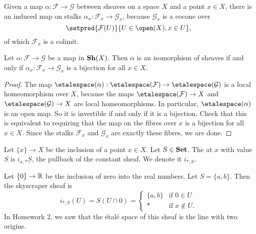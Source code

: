 Given a map $\alpha\colon \mathcal{F} \to \mathcal{G}$ between sheaves on a space $X$ and a point $x \in X$, there is an induced map on stalks $\alpha_x\colon \mathcal{F}_x \to \mathcal{G}_x$, because $\mathcal{G}_x$ is a cocone over
\[\setpred{\mathcal{F}(U)}{U \in \open(X),x \in U}\text{,}\]
of which $\mathcal{F}_x$ is a colimit. 

\begin{lem}
    Let $\alpha\colon \mathcal{F} \to \mathcal{G}$ be a map in $\operatorname{\mathbf{Sh}}(X)$. 
    Then $\alpha$ is an isomorphism of sheaves if and only if $\alpha_x\colon \mathcal{F}_x \to \mathcal{G}_x$ is a bijection for all $x \in X$. 
\end{lem}
\begin{proof}
    The map $\etalespace(\alpha)\colon \etalespace(\mathcal{F}) \to \etalespace(\mathcal{G})$ is a local homeomorphism over $X$, because the maps $\etalespace(\mathcal{F}) \to X$ and $\etalespace(\mathcal{G}) \to X$ are local homeomorphisms. In particular, $\etalespace(\alpha)$ is an open map. So it is invertible if and only if it is a bijection. Check that this is equivalent to requiring that the map on the fibres over $x$ is a bijection for all $x \in X$. Since the stalks $\mathcal{F}_x$ and $\mathcal{G}_x$ are exactly these fibres, we are done. 
\end{proof}

\begin{defn}
    Let $\{x\} \to X$ be the inclusion of a point $x \in X$. Let $S \in \mathbf{Set}$. The  at $x$ with value $S$ is $i_{x,*}\underline{S}$, the pullback of the constant sheaf. We denote it $i_{*, S}$.
\end{defn}

\begin{exmp}
    Let $\{0\} \to \mathbb{R}$ be the inclusion of zero into the real numbers. Let $S = \{a,b\}$. Then the skyscraper sheaf is 
    \[
        i_{*,S}(U) = S(U \cap 0) =     \begin{cases}
        \{a,b\} & \text{if } 0 \in U\\
        * & \text{if } x \notin U.
    \end{cases}
    \]
    In Homework 2, we saw that the étalé space of this sheaf is the line with two origins. 
\end{exmp}